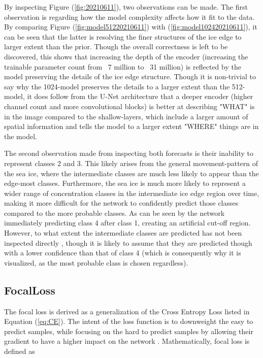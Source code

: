 By inspecting Figure (\ref{fig:20210611}), two observations can be made. The first observation is regarding how the model complexity affects how it fit to the data. By comparing Figure (\ref{fig:model51220210611}) with (\ref{fig:model102420210611}), it can be seen that the latter is resolving the finer structures of the ice edge to larger extent than the prior. Though the overall correctness is left to be discovered, this shows that increasing the depth of the encoder (increasing the trainable parameter count from ~7 million to ~31 million) is reflected by the model preserving the details of the ice edge structure. Though it is non-trivial to say why the 1024-model preserves the details to a larger extent than the 512-model, it does follow from the U-Net architecture that a deeper encoder (higher channel count and more convolutional blocks) is better at describing "WHAT" is in the image compared to the shallow-layers, which include a larger amount of spatial information and tells the model to a larger extent "WHERE" things are in the model. 

The second observation made from inspecting both forecasts is their inability to represent classes 2 and 3. This likely arises from the general movement-pattern of the sea ice, where the intermediate classes are much less likely to appear than the edge-most classes. Furthermore, the sea ice is much more likely to represent a wider range of concentration classes in the intermediate ice edge region over time, making it more difficult for the network to confidently predict those classes compared to the more probable classes. As can be seen by the network immediately predicting class 4 after class 1, creating an artificial cut-off region. However, to what extent the intermediate classes are predicted has not been inspected directly , though it is likely to assume that they are predicted though with a lower confidence than that of class 4 (which is consequently why it is visualized, as the most probable class is chosen regardless).



\subsection{FocalLoss}
The focal loss is derived as a generalization of the Cross Entropy Loss listed in Equation (\ref{eq:CE}). The intent of the loss function is to downweight the easy to predict samples, while focusing on the hard to predict samples by allowing their gradient to have a higher impact on the network \cite{Lin2017}. Mathematically, focal loss is defined as

